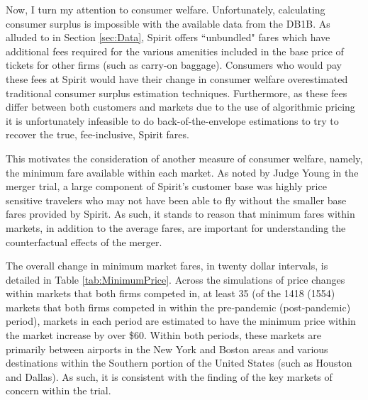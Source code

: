 \documentclass{article}
\begin{document}

     Now, I turn my attention to consumer welfare. Unfortunately, calculating consumer surplus is impossible with the available data from the DB1B. As alluded to in Section \ref{sec:Data}, Spirit offers ``unbundled" fares which have additional fees required for the various amenities included in the base price of tickets for other firms (such as carry-on baggage). Consumers who would pay these fees at Spirit would have their change in consumer welfare overestimated traditional consumer surplus estimation techniques. Furthermore, as these fees differ between both customers and markets due to the use of algorithmic pricing \citep{senate_permanent_committee_on_investigations_majority_2024} it is unfortunately infeasible to do back-of-the-envelope estimations to try to recover the true, fee-inclusive, Spirit fares. 
     
     This motivates the consideration of another measure of consumer welfare, namely, the minimum fare available within each market. As noted by Judge Young in the merger trial, a large component of Spirit's customer base was highly price sensitive travelers who may not have been able to fly without the smaller base fares provided by Spirit. As such, it stands to reason that minimum fares within markets, in addition to the average fares, are important for understanding the counterfactual effects of the merger. 
     
     The overall change in minimum market fares, in twenty dollar intervals, is detailed in Table \ref{tab:MinimumPrice}. Across the simulations of price changes within markets that both firms competed in, at least 35 (of the 1418 (1554) markets that both firms competed in within the pre-pandemic (post-pandemic) period), markets in each period are estimated to have the minimum price within the market increase by over \$60. Within both periods, these markets are primarily between airports in the New York and Boston areas and various destinations within the Southern portion of the United States (such as Houston and Dallas). As such, it is consistent with the finding of the key markets of concern within the trial. 
\end{document}
